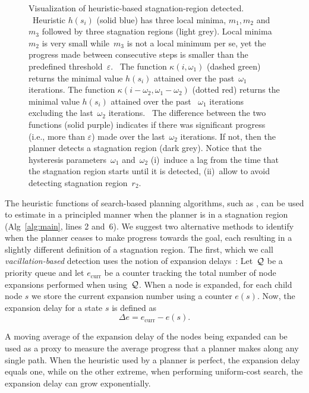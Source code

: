 \documentclass{article}
\begin{document}
\begin{figure}[t]
  \caption{%
    Visualization of heuristic-based stagnation-region detected.   
	~Heuristic $h(s_i)$ (solid blue) has three local minima, $m_1, m_2$ and $m_3$ followed by three stagnation regions (light grey). Local minima $m_2$ is very small while~$m_3$ is not a local minimum per se, yet the progress made between consecutive steps is smaller than the predefined threshold~$\varepsilon$.
    ~The function $\kappa(i,\omega_1)$ (dashed green) returns the minimal value $h(s_i)$ attained over the past~$\omega_1$ iterations.
    The function $\kappa(i-\omega_2,\omega_1-\omega_2)$ (dotted red) returns the minimal value $h(s_i)$ attained over the past ~$\omega_1$ iterations excluding the last~$\omega_2$ iterations.
    ~The difference between the two functions (solid purple) indicates if there was significant progress (i.e., more than $\varepsilon$) made over the last~$\omega_2$ iterations. 
    If not, then the planner detects a stagnation region (dark grey).
		Notice that the hysteresis parameters~$\omega_1$ and~$\omega_2$ 
		(i)~induce a lag from the time that the stagnation region starts until it is detected,
		(ii)~allow to avoid detecting stagnation region~$r_2$.  
		}%

  \label{fig:filmstrip-local-min2}%

  \vspace{-2.5mm}

\end{figure}

The heuristic functions of search-based planning algorithms, such as \mhastar, can be used to estimate in a principled manner when the planner is in a stagnation region (Alg~\ref{alg:main}, lines 2 and~6). 
%
We suggest two alternative methods to identify when the planner ceases to make progress towards the goal, each resulting in a slightly different definition of a  stagnation region.
The first, which we call \emph{vacillation-based} detection uses the notion of expansion delays~\cite{DTR11}:
Let~$\mathcal{Q}$ be a priority queue and let $e_\text{curr}$ be a counter tracking the total number of node expansions performed when using~$\mathcal{Q}$.
When a node is expanded, for each child node $s$ we store the current expansion number using a counter $e(s)$.
Now, the expansion delay for a state $s$ is defined as
$$
\Delta e = e_\text{curr} - e(s).
$$ 

A moving average of the expansion delay of the nodes being expanded can be used as a proxy to measure the average progress that a planner makes along any single path.
When the heuristic used by a planner is perfect, the expansion delay equals one, while on the other extreme, when performing uniform-cost search, the expansion delay can grow exponentially.
\end{document}
